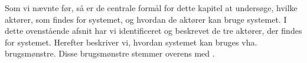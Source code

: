 






Som vi nævnte før, så er de centrale formål for dette kapitel at undersøge, hvilke aktører, som findes for systemet, og hvordan de aktører kan bruge systemet. I dette ovenstående afsnit har vi identificeret og beskrevet de tre aktører, der findes for systemet. Herefter beskriver vi, hvordan systemet kan bruges vha. brugsmønstre. Disse brugsmønstre stemmer overens med .